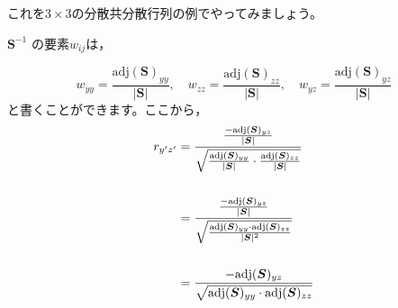 \documentclass[dvipsnames]{ltjsarticle}
\begin{document}
これを$3 \times 3$の分散共分散行列の例でやってみましょう。

$\bm{S}^{-1}$ の要素$w_{ij}$は，

\[
w_{yy} = \frac{\text{adj} (\bm{S})_{yy}}{|\bm{S}|}, \quad w_{zz} = \frac{\text{adj} (\bm{S})_{zz}}{|\bm{S}|}, \quad w_{yz} = \frac{\text{adj} (\bm{S})_{yz}}{|\bm{S}|}
\]
と書くことができます。ここから，
\begin{align}
r_{y'z'} &= \frac{\frac{-\text{adj} (\bm{S})_{yz} }{ |\bm{S}|}}
{\sqrt{\frac{\text{adj} (\bm{S})_{yy} }{|\bm{S}|} \cdot \frac{\text{adj} (\bm{S})_{zz}}  {|\bm{S}|}}}   \notag \\\\
& = \frac{\frac{-\text{adj} (\bm{S})_{yz}}{|\bm{S}|}}
{\sqrt{\frac{\text{adj} (\bm{S})_{yy} \cdot \text{adj} (\bm{S})_{zz}} {|\bm{S}|^2}}} \notag \\\\
& = \frac{-\text{adj} (\bm{S})_{yz}}{\sqrt{\text{adj} (\bm{S})_{yy} \cdot \text{adj} (\bm{S})_{zz}}} \notag \\
\end{align}
\end{document}
